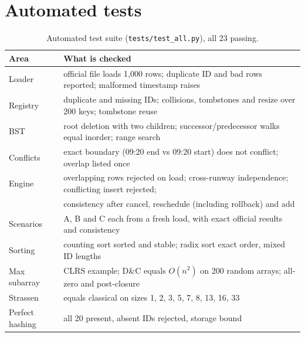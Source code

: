 \documentclass[11pt]{article}
\begin{document}
\section{Automated tests}\label{app:tests}
\begin{table}[ht]\centering
\caption{Automated test suite (\texttt{tests/test\_all.py}), all 23 passing.}\label{tab:tests}
\small
\begin{tabular}{@{}ll@{}}
\toprule
Area & What is checked \\
\midrule
Loader & official file loads 1{,}000 rows; duplicate ID and bad rows reported; malformed timestamp raises \\
Registry & duplicate and missing IDs; collisions, tombstones and resize over 200 keys; tombstone reuse \\
BST & root deletion with two children; successor/predecessor walks equal inorder; range search \\
Conflicts & exact boundary (09:20 end vs 09:20 start) does not conflict; overlap listed once \\
Engine & overlapping rows rejected on load; cross-runway independence; conflicting insert rejected; \\
 & consistency after cancel, reschedule (including rollback) and add \\
Scenarios & A, B and C each from a fresh load, with exact official results and consistency \\
Sorting & counting sort sorted and stable; radix sort exact order, mixed ID lengths \\
Max subarray & CLRS example; D\&C equals $O(n^2)$ on 200 random arrays; all-zero and post-closure \\
Strassen & equals classical on sizes 1, 2, 3, 5, 7, 8, 13, 16, 33 \\
Perfect hashing & all 20 present, absent IDs rejected, storage bound \\
\bottomrule
\end{tabular}
\end{table}
\end{document}

